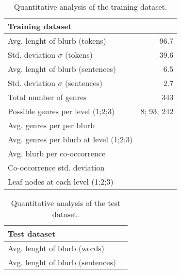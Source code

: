 \documentclass[11pt]{article}
\begin{document}
\begin{table}
\begin{center}
\begin{tabular}{|l|r|}
\hline\centering\textbf{Training dataset}  &             \\
\hline
Avg. lenght of blurb (tokens)              &  96.7       \\
Std. deviation $\sigma$ (tokens)           &  39.6       \\
Avg. lenght of blurb (sentences)           &  6.5        \\
Std. deviation $\sigma$ (sentences)        &  2.7        \\
\hline
Total number of genres                     &  343        \\
Possible genres per level (1;2;3)          &  8; 93; 242 \\
Avg. genres per per blurb                  &             \\
Avg. genres per blurb at level (1;2;3)     &             \\
\hline
Avg. blurb per co-occorrence               &             \\
Co-occorrence std. deviation               &             \\
Leaf nodes at each level (1;2;3)           &             \\

\hline
\end{tabular}
\end{center}
\caption{\label{quantitivy-analysis-train}Quantitative analysis of the training dataset.}
\end{table}


\begin{table}
\begin{center}
\begin{tabular}{|l|r|}
\hline\centering\textbf{Test dataset}  &         \\
\hline
Avg. lenght of blurb (words)           &         \\
Avg. lenght of blurb (sentences)       &         \\

\hline
\end{tabular}
\end{center}
\caption{\label{quantitivy-analysis-test}Quantitative analysis of the test dataset.}
\end{table}
\end{document}
